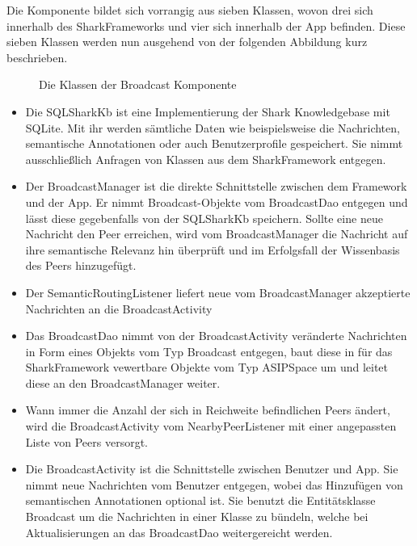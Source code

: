 Die Komponente bildet sich vorrangig aus sieben Klassen, wovon drei sich innerhalb des SharkFrameworks und vier sich innerhalb der App befinden. Diese sieben Klassen werden nun ausgehend von der folgenden Abbildung kurz beschrieben.
\begin{figure}[H]
	\centering
	\hspace*{1cm}
	\caption{Die Klassen der Broadcast Komponente}
	\label{fig:broadcastStructure}
\end{figure}
\begin{itemize}
	\item Die SQLSharkKb ist eine Implementierung der Shark Knowledgebase mit SQLite. Mit ihr werden sämtliche Daten wie beispielsweise die Nachrichten, semantische Annotationen oder auch Benutzerprofile gespeichert. Sie nimmt ausschließlich Anfragen von Klassen aus dem SharkFramework entgegen.
	\item Der BroadcastManager ist die direkte Schnittstelle zwischen dem Framework und der App. Er nimmt Broadcast-Objekte vom BroadcastDao entgegen und lässt diese gegebenfalls von der SQLSharkKb speichern. Sollte eine neue Nachricht den Peer erreichen, wird vom BroadcastManager die Nachricht auf ihre semantische Relevanz hin überprüft und im Erfolgsfall der Wissenbasis des Peers hinzugefügt.
	\item Der SemanticRoutingListener liefert neue vom BroadcastManager akzeptierte Nachrichten an die BroadcastActivity
	\item Das BroadcastDao nimmt von der BroadcastActivity veränderte Nachrichten in Form eines Objekts vom Typ Broadcast entgegen, baut diese in für das SharkFramework vewertbare Objekte vom Typ ASIPSpace um und leitet diese an den BroadcastManager weiter.
	\item Wann immer die Anzahl der sich in Reichweite befindlichen Peers ändert, wird die BroadcastActivity vom NearbyPeerListener mit einer angepassten Liste von Peers versorgt.
	\item Die BroadcastActivity ist die Schnittstelle zwischen Benutzer und App. Sie nimmt neue Nachrichten vom Benutzer entgegen, wobei das Hinzufügen von semantischen Annotationen optional ist. Sie benutzt die Entitätsklasse Broadcast um die Nachrichten in einer Klasse zu bündeln, welche bei Aktualisierungen an das BroadcastDao weitergereicht werden. 
\end{itemize}



